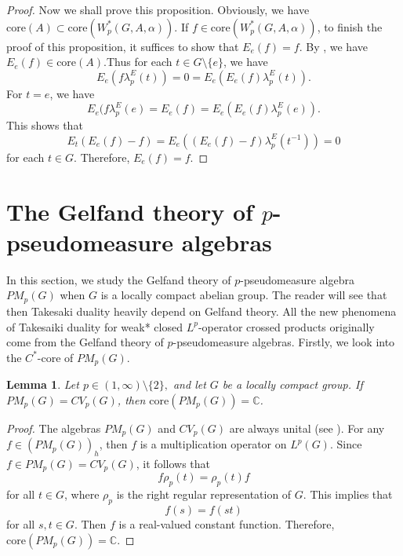 \documentclass[reqno,11pt]{amsart}
\theoremstyle{plain}
\newtheorem{prop}[thm]{Proposition}
\newtheorem{lem}[thm]{Lemma}
\theoremstyle{definition}
\theoremstyle{remark}
\begin{document}
\begin{proof}
Now we shall prove this proposition. Obviously, we have $\mathrm{core}(A)\subset \mathrm{core}(W^*_p(G,A,\alpha))$. If $f\in \mathrm{core}(W^*_p(G,A,\alpha))$, to finish the proof of this proposition, it suffices to show that $E_e(f)=f$. By \cite[Proposition 2.16]{Choi and}, we have $E_e(f)\in \mathrm{core}(A)$.Thus for each $t\in G\setminus\{e\}$, we have $$E_e(f\lambda_p^E(t))=0=E_e(E_e(f)\lambda_p^E(t)).$$
For $t=e$, we have $$E_e(f\lambda_p^E(e)=E_e(f)=E_e(E_e(f)\lambda_p^E(e)).$$
This shows that $$E_t(E_e(f)-f)=E_e((E_e(f)-f)\lambda_p^E(t^{-1}))=0$$ for each $t\in G$. Therefore, $E_e(f)=f$.
\end{proof}




\section{The Gelfand theory of $p$-pseudomeasure algebras}

In this section, we study the Gelfand theory of $p$-pseudomeasure algebra $PM_p(G)$ when $G$ is a locally compact abelian group. The reader will see that then Takesaki duality heavily depend on Gelfand theory. All the new phenomena of Takesaiki duality for weak* closed $L^p$-operator crossed products originally come from the Gelfand theory of $p$-pseudomeasure algebras.
Firstly, we look into the $C^*$-core of $PM_p(G)$.

\begin{lem}\label{core2}
Let $p\in (1,\infty)\setminus\{2\},$ and let $G$ be a locally compact group. If $PM_p(G)=CV_p(G)$, then $\mathrm{core}(PM_p(G))=\mathbb{C}$.
\end{lem}
\begin{proof}
The algebras $PM_p(G)$ and $CV_p(G)$ are always unital (see \cite{Gardella and Thiel iso}). For any $f\in (PM_p(G))_h$, then $f$ is a multiplication operator on $L^p(G)$. Since $f\in PM_p(G)=CV_p(G)$, it follows that $$f\rho_p(t)=\rho_p(t)f$$ for all $t\in G$, where $\rho_p$ is the right regular representation of $G$. This implies that $$f(s)=f(st)$$ for all $s,t\in G$. Then $f$ is a real-valued constant function. Therefore, $\mathrm{core}(PM_p(G))=\mathbb{C}$.
\end{proof}
\end{document}
